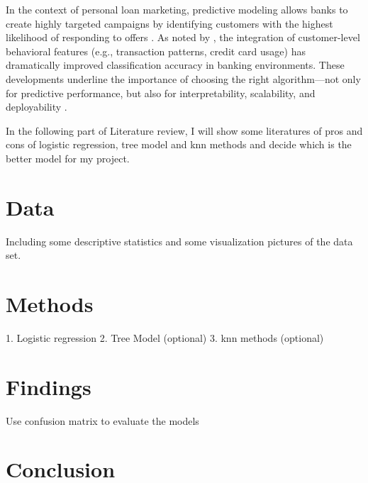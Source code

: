 \documentclass{article}
\begin{document}
In the context of personal loan marketing, predictive modeling allows banks to create highly targeted campaigns by identifying customers with the highest likelihood of responding to offers \citep{Rahman2024TRANSFORMINGLEARNING}. As noted by \cite{BharathiS2022AnCustomers}, the integration of customer-level behavioral features (e.g., transaction patterns, credit card usage) has dramatically improved classification accuracy in banking environments. These developments underline the importance of choosing the right algorithm—not only for predictive performance, but also for interpretability, scalability, and deployability \citep{Al-Quraishi2025BridgingPrediction}.

In the following part of Literature review, I will show some literatures of pros and cons of logistic regression, tree model and knn methods and decide which is the better model for my project. 

\section{Data}
Including some descriptive statistics and some visualization pictures of the data set.  

\section{Methods}
1. Logistic regression 
2. Tree Model (optional)
3. knn methods (optional)

\section{Findings}
Use confusion matrix to evaluate the models

\section{Conclusion}



  

\end{document}
